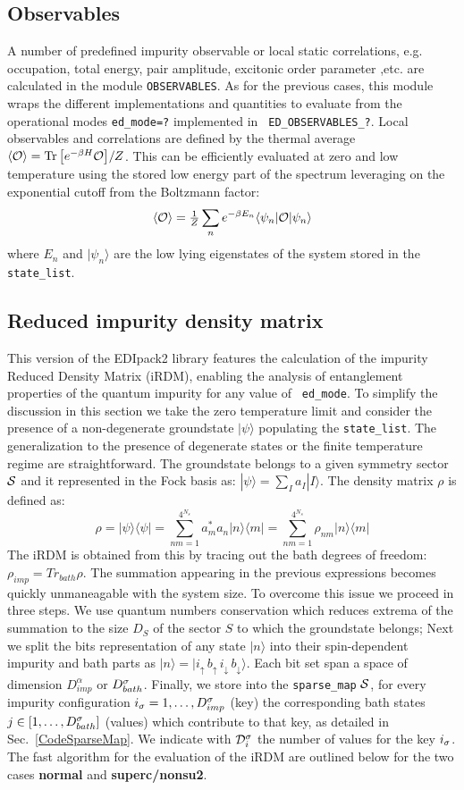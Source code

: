 \documentclass[final,3p,10pt]{elsarticle}
\newcommand{\secu}[1]
{Sec.~\ref{#1}}
\newcommand{\ket}[1]
{|#1\rangle}
\newcommand{\bra}[1]
{\langle #1|}
\def\a{\alpha}       \def\b{\beta}   \def\g{\gamma}   \def\d{\delta}
\def\ibra{\langle}
\def\iket{\rangle}
\def\NAME{{\rm EDIpack2 }}
\begin{document}
\subsection{Observables}\label{sSecObc}
A number of predefined impurity observable or local static
correlations, e.g. occupation, total energy, pair amplitude, excitonic
order parameter ,etc.   are calculated in the module
\texttt{OBSERVABLES}. As for the previous cases, this module wraps the
different implementations and quantities to evaluate from the
operational modes {\tt ed\_mode=?} implemented in {\tt
  ED\_OBSERVABLES\_?}. 
Local observables and correlations are defined by the thermal average  $\ibra \OO\iket =
\Tr{\left[e^{-\beta H}\OO\right]}/Z$. This can be efficiently evaluated at zero and
low temperature using the stored low energy part of the spectrum
leveraging on the exponential cutoff from the Boltzmann factor:
$$
\ibra \OO\iket  = \tfrac{1}{Z}\sum_n e^{-\beta
  E_n}\bra{\psi_n}\OO\ket{\psi_n}
$$
where $E_n$ and $\ket{\psi_n}$ are the low lying eigenstates of the
system stored in the {\tt state\_list}. 



\subsection{Reduced impurity density matrix}\label{sSecRDM}
This version of the \NAME library features the calculation of the
impurity Reduced Density Matrix (iRDM), enabling the analysis of
entanglement properties of the quantum impurity for any value of {\tt
  ed\_mode}.
To simplify the discussion in this section we take the zero
temperature limit and consider the presence of a non-degenerate
groundstate $\ket{\psi}$ populating the {\tt state\_list}.
The generalization to the presence of degenerate states or the finite
temperature regime are straightforward.
The groundstate belongs to a given symmetry sector ${\cal S}$ and it
represented in the Fock basis as:  $\ket{\psi} = \sum_I a_I \ket{I}$. 
The density matrix $\rho$ is defined as:
$$
\rho = \ket{\psi}\bra{\psi} = \sum_{nm=1}^{4^{N_s}} a^*_ma_n \ket{n}\bra{m} =\sum_{nm=1}^{4^{N_s}} \rho_{nm} \ket{n}\bra{m} 
$$
The iRDM is obtained from this by tracing out the bath degrees of
freedom: $\rho_{imp}=Tr_{bath}\rho$. The summation appearing in the
previous expressions becomes quickly unmaneagable with the system
size. To overcome this issue we proceed in three steps. 
We use quantum numbers conservation which
reduces extrema of the summation to the size $D_S$ of the sector $S$
to which the groundstate belongs;
Next we split the bits representation of any state $\ket{n}$ into
their spin-dependent impurity and bath parts as $\ket{n} = \ket{
  i_\uparrow\,  b_\uparrow\, i_\downarrow \, b_\downarrow}$. Each bit
set span a space of dimension $D^\a_{imp}$ or $D^\sigma_{bath}$. 
Finally, we store into the {\tt sparse\_map} ${\cal S}$, for every impurity configuration 
$i_\sigma =1,\dots,D^\sigma_{imp}$ (key) the corresponding bath states $j\in[1,\dots,D^\sigma_{bath}]$
(values) which contribute to that key, as detailed in
\secu{CodeSparseMap}.
We indicate with ${\cal D}^\sigma_{i}$ the number of values for the key $i_\sigma$.
The fast algorithm for the evaluation of the iRDM are outlined below
for the two cases {\bf normal} and {\bf superc/nonsu2}.
\end{document}
